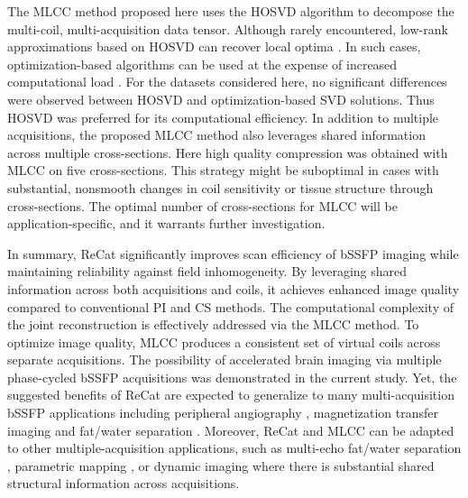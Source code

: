 \documentclass[11pt, onecolumn]{article}
\begin{document}
The MLCC method proposed here uses the HOSVD algorithm to decompose the multi-coil, multi-acquisition data tensor. Although rarely encountered, low-rank approximations based on HOSVD can recover local optima \cite{de2000best}. In such cases, optimization-based algorithms can be used at the expense of increased computational load \cite{cichocki2015tensor}. For the datasets considered here, no significant differences were observed between HOSVD and optimization-based SVD solutions. Thus HOSVD was preferred for its computational efficiency. In addition to multiple acquisitions, the proposed MLCC method also leverages shared information across multiple cross-sections. Here high quality compression was obtained with MLCC on five cross-sections. This strategy might be suboptimal in cases with substantial, nonsmooth changes in coil sensitivity or tissue structure through cross-sections. The optimal number of cross-sections for MLCC will be application-specific, and it warrants further investigation. 

In summary, ReCat significantly improves scan efficiency of bSSFP imaging while maintaining reliability against field inhomogeneity. By leveraging shared information across both acquisitions and coils, it achieves enhanced image quality compared to conventional PI and CS methods. The computational complexity of the joint reconstruction is effectively addressed via the MLCC method. To optimize image quality, MLCC produces a consistent set of virtual coils across separate acquisitions. The possibility of accelerated brain imaging via multiple phase-cycled bSSFP acquisitions was demonstrated in the current study. Yet, the suggested benefits of ReCat are expected to generalize to many multi-acquisition bSSFP applications including peripheral angiography \cite{Cukur:2011iy}, magnetization transfer imaging \cite{Bieri:2008fl} and fat/water separation \cite{MultipleTR}. Moreover, ReCat and MLCC can be adapted to other multiple-acquisition applications, such as multi-echo fat/water separation \cite{ReederIDEAL}, parametric mapping \cite{Doneva:2010fe, Lee:2016jh}, or dynamic imaging \cite{Jung:2009ir} where there is substantial shared structural information across acquisitions. 
\end{document}
